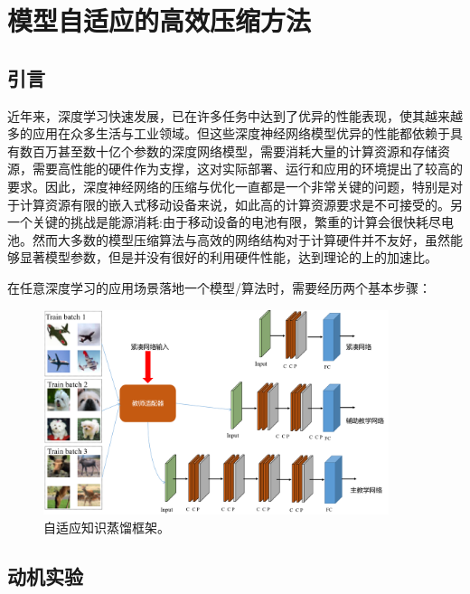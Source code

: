 
\chapter{模型自适应的高效压缩方法}

\section{引言}

近年来，深度学习快速发展，已在许多任务中达到了优异的性能表现，使其越来越多的应用在众多生活与工业领域。但这些深度神经网络模型优异的性能都依赖于具有数百万甚至数十亿个参数的深度网络模型，需要消耗大量的计算资源和存储资源，需要高性能的硬件作为支撑，这对实际部署、运行和应用的环境提出了较高的要求。因此，深度神经网络的压缩与优化一直都是一个非常关键的问题，特别是对于计算资源有限的嵌入式移动设备来说，如此高的计算资源要求是不可接受的。另一个关键的挑战是能源消耗:由于移动设备的电池有限，繁重的计算会很快耗尽电池。然而大多数的模型压缩算法与高效的网络结构对于计算硬件并不友好，虽然能够显著模型参数，但是并没有很好的利用硬件性能，达到理论的上的加速比。

在任意深度学习的应用场景落地一个模型/算法时，需要经历两个基本步骤：

\begin{figure}[ht]
	\centering
	\includegraphics[width=0.9\textwidth]{figures/adaptive_frame.png}
	\caption{自适应知识蒸馏框架。}
	\label{frame}
\end{figure}

\section{动机实验}
